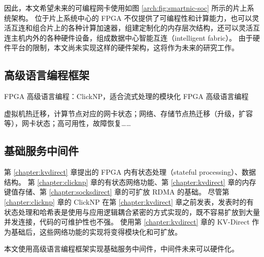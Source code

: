 因此，本文希望未来的可编程网卡使用如图 \ref{arch:fig:smartnic-soc} 所示的片上系统架构。
位于片上系统中心的 FPGA 不仅提供了可编程性和计算能力，也可以灵活互连和组合片上的各种计算加速器，组建定制化的内存层次结构，还可以灵活互连主机内外的各种硬件设备，组成数据中心智能互连（intelligent fabric）。
由于硬件平台的限制，本文尚未实现这样的硬件架构，这将作为未来的研究工作。



\subsection{高级语言编程框架}

FPGA 高级语言编程：ClickNP，适合流式处理的模块化 FPGA 高级语言编程

虚拟机热迁移，计算节点对应的网卡状态；网络、存储节点热迁移（升级，扩容等），网卡状态；高可用性，故障恢复……

\subsection{基础服务中间件}



第 \ref{chapter:kvdirect} 章提出的 FPGA 内有状态处理（stateful processing）、数据结构。
第 \ref{chapter:clicknp} 章的有状态网络功能、第 \ref{chapter:kvdirect} 章的内存键值存储、第 \ref{chapter:socksdirect} 章的可扩放 RDMA 的基础。
尽管第 \ref{chapter:clicknp} 章的 ClickNP 在第 \ref{chapter:kvdirect} 章之前发表，发表时的有状态处理和哈希表是使用与应用逻辑耦合紧密的方式实现的，既不容易扩放到大量并发连接，代码的可维护性也不强。
使用第 \ref{chapter:kvdirect} 章的 KV-Direct 作为基础后，这些网络功能的实现将变得模块化和可扩放。

本文使用高级语言编程框架实现基础服务中间件，中间件未来可以硬件化。
